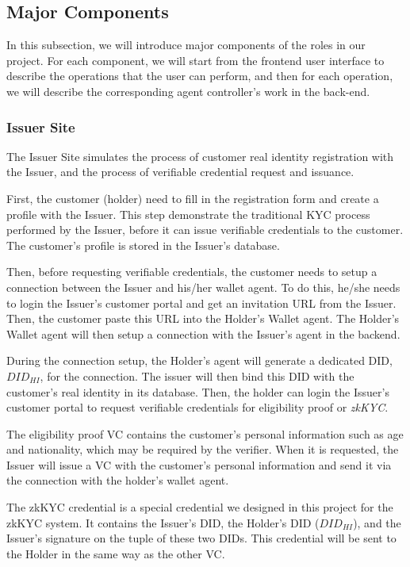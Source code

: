 \documentclass[
]{report}
\begin{document}
\subsection{Major Components}
In this subsection, we will introduce major components of the roles
in our project. For each component, we will start from the frontend user
interface to describe the operations that the user can perform, and then
for each operation, we will describe the corresponding agent controller's
work in the back-end.
\subsubsection{Issuer Site}
The Issuer Site simulates the process of customer real identity registration
with the Issuer, and the process of verifiable credential request and 
issuance. 

First, the customer (holder) need to fill in the registration form and create a
profile with the Issuer. This step demonstrate the traditional KYC process
performed by the Issuer, before it can issue verifiable credentials to the
customer. The customer's profile is stored in the Issuer's database.

Then, before requesting verifiable credentials, the customer needs to setup a 
connection between the Issuer and his/her wallet agent. To do this, he/she
needs to login the Issuer's customer portal and get an invitation URL from
the Issuer. Then, the customer paste this URL into the Holder's Wallet agent.
The Holder's Wallet agent will then setup a connection with the Issuer's
agent in the backend.

During the connection setup, the Holder's agent will generate a dedicated DID,
\texttt{$DID_{HI}$}, for the connection. The issuer will then bind this DID
with the customer's real identity in its database.
Then, the holder can login the Issuer's customer portal to request verifiable
credentials for eligibility proof or \emph{zkKYC}.

The eligibility proof VC contains the customer's personal information such as
age and nationality, which may be required by the verifier. When it is
requested, the Issuer will issue a VC with the customer's personal information
and send it via the connection with the holder's wallet agent.

The zkKYC credential is a special credential we designed in this project for
the zkKYC system. It contains the Issuer's DID, the Holder's DID 
(\texttt{$DID_{HI}$}), and the Issuer's signature on the tuple of these two
DIDs. This credential will be sent to the Holder in the same way as the other
VC.
\end{document}
